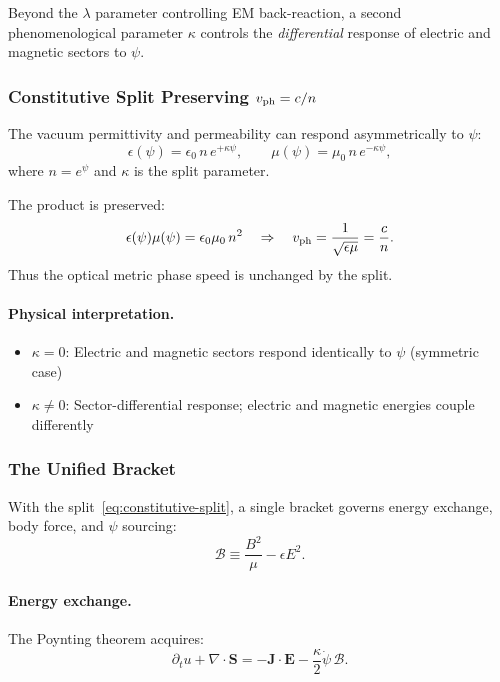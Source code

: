 Beyond the $\lambda$ parameter controlling EM back-reaction, a second 
phenomenological parameter $\kappa$ controls the \textit{differential} 
response of electric and magnetic sectors to $\psi$.

\subsubsection{Constitutive Split Preserving $v_{\rm ph} = c/n$}

The vacuum permittivity and permeability can respond asymmetrically to $\psi$:
\begin{equation}\label{eq:constitutive-split}
\epsilon(\psi) = \epsilon_0\, n\, e^{+\kappa\psi}, \qquad
\mu(\psi) = \mu_0\, n\, e^{-\kappa\psi},
\end{equation}
where $n = e^\psi$ and $\kappa$ is the split parameter.

The product is preserved:
\begin{equation}
\epsilon(\psi)\mu(\psi) = \epsilon_0\mu_0\, n^2 \quad \Rightarrow \quad
v_{\rm ph} = \frac{1}{\sqrt{\epsilon\mu}} = \frac{c}{n}.
\end{equation}
Thus the optical metric phase speed is unchanged by the split.

\paragraph{Physical interpretation.}
\begin{itemize}
\item $\kappa = 0$: Electric and magnetic sectors respond identically to $\psi$ (symmetric case)
\item $\kappa \neq 0$: Sector-differential response; electric and magnetic energies couple differently
\end{itemize}

\subsubsection{The Unified Bracket}

With the split~\eqref{eq:constitutive-split}, a single bracket governs energy exchange, body force, and $\psi$ sourcing:
\begin{equation}\label{eq:unified-bracket}
\mathcal{B} \equiv \frac{B^2}{\mu} - \epsilon E^2.
\end{equation}

\paragraph{Energy exchange.}
The Poynting theorem acquires:
\begin{equation}
\partial_t u + \nabla\cdot\mathbf{S} = -\mathbf{J}\cdot\mathbf{E} - \frac{\kappa}{2}\dot{\psi}\,\mathcal{B}.
\end{equation}

